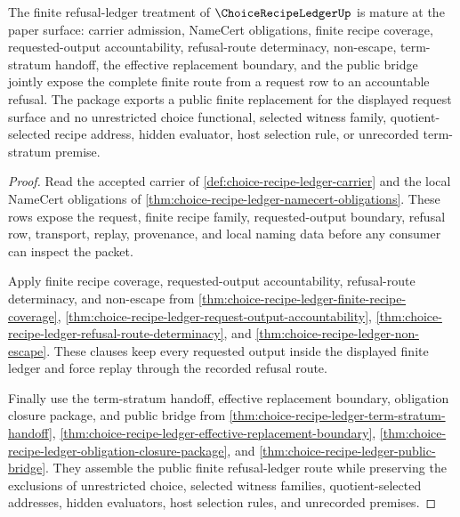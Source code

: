 \begin{theorem}
\label{thm:choice-recipe-ledger-mature-package}
The finite refusal-ledger treatment of $\ChoiceRecipeLedgerUp$ is mature at the paper surface: carrier admission, NameCert obligations, finite recipe coverage, requested-output accountability, refusal-route determinacy, non-escape, term-stratum handoff, the effective replacement boundary, and the public bridge jointly expose the complete finite route from a request row to an accountable refusal. The package exports a public finite replacement for the displayed request surface and no unrestricted choice functional, selected witness family, quotient-selected recipe address, hidden evaluator, host selection rule, or unrecorded term-stratum premise.
\end{theorem}
\begin{proof}
Read the accepted carrier of \autoref{def:choice-recipe-ledger-carrier} and the local NameCert obligations of \autoref{thm:choice-recipe-ledger-namecert-obligations}. These rows expose the request, finite recipe family, requested-output boundary, refusal row, transport, replay, provenance, and local naming data before any consumer can inspect the packet.

Apply finite recipe coverage, requested-output accountability, refusal-route determinacy, and non-escape from \autoref{thm:choice-recipe-ledger-finite-recipe-coverage}, \autoref{thm:choice-recipe-ledger-request-output-accountability}, \autoref{thm:choice-recipe-ledger-refusal-route-determinacy}, and \autoref{thm:choice-recipe-ledger-non-escape}. These clauses keep every requested output inside the displayed finite ledger and force replay through the recorded refusal route.

Finally use the term-stratum handoff, effective replacement boundary, obligation closure package, and public bridge from \autoref{thm:choice-recipe-ledger-term-stratum-handoff}, \autoref{thm:choice-recipe-ledger-effective-replacement-boundary}, \autoref{thm:choice-recipe-ledger-obligation-closure-package}, and \autoref{thm:choice-recipe-ledger-public-bridge}. They assemble the public finite refusal-ledger route while preserving the exclusions of unrestricted choice, selected witness families, quotient-selected addresses, hidden evaluators, host selection rules, and unrecorded premises.
\end{proof}

